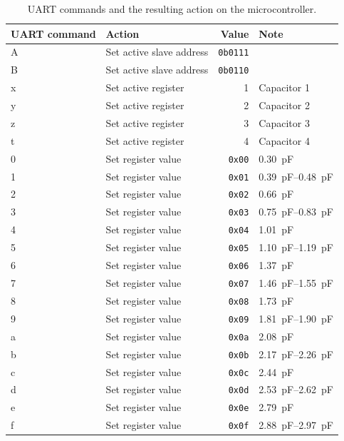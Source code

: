 \begin{table}[htbp]
    \centering
    \begin{tabular}{|l|l|r|l|}
        \hline
        UART command & Action & Value & Note \\
        \hline
        A & Set active slave address & \texttt{0b0111} & \\
        B & Set active slave address & \texttt{0b0110} & \\
        \hline
        x & Set active register & 1 & Capacitor 1\\
        y & Set active register & 2 & Capacitor 2\\
        z & Set active register & 3 & Capacitor 3\\
        t & Set active register & 4 & Capacitor 4\\
        \hline
        0 & Set register value & \texttt{0x00} & \SI{0.30}{pF}\\
        1 & Set register value & \texttt{0x01} & \SIrange{0.39}{0.48}{pF}\\
        2 & Set register value & \texttt{0x02} & \SI{0.66}{pF}\\
        3 & Set register value & \texttt{0x03} & \SIrange{0.75}{0.83}{pF}\\
        4 & Set register value & \texttt{0x04} & \SI{1.01}{pF}\\
        5 & Set register value & \texttt{0x05} & \SIrange{1.10}{1.19}{pF}\\
        6 & Set register value & \texttt{0x06} & \SI{1.37}{pF}\\
        7 & Set register value & \texttt{0x07} & \SIrange{1.46}{1.55}{pF}\\
        8 & Set register value & \texttt{0x08} & \SI{1.73}{pF}\\
        9 & Set register value & \texttt{0x09} & \SIrange{1.81}{1.90}{pF}\\
        a & Set register value & \texttt{0x0a} & \SI{2.08}{pF}\\
        b & Set register value & \texttt{0x0b} & \SIrange{2.17}{2.26}{pF}\\
        c & Set register value & \texttt{0x0c} & \SI{2.44}{pF}\\
        d & Set register value & \texttt{0x0d} & \SIrange{2.53}{2.62}{pF}\\
        e & Set register value & \texttt{0x0e} & \SI{2.79}{pF}\\
        f & Set register value & \texttt{0x0f} & \SIrange{2.88}{2.97}{pF}\\
        \hline
    \end{tabular}
    \caption{UART commands and the resulting action on the microcontroller.}
    \label{tab:rffe_commands}
\end{table}

